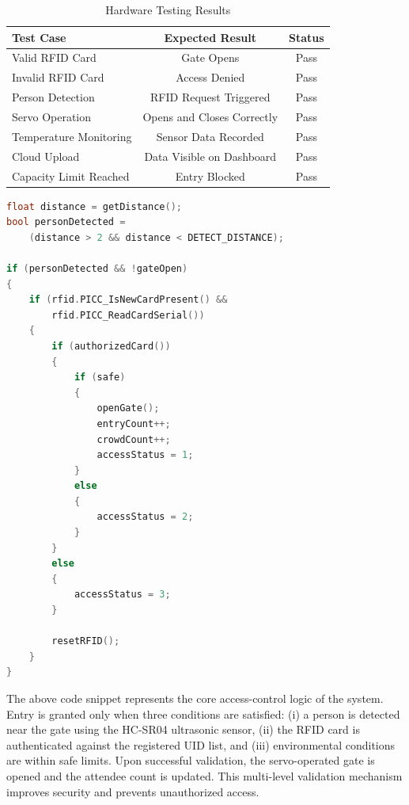 \documentclass[12pt,a4paper]{report}
\begin{document}
\vspace{0.5cm}
{\footnotesize

\begin{table}[H]
\centering
\caption{Hardware Testing Results}
\begin{tabular}{|l|c|c|}
\hline
Test Case & Expected Result & Status \\
\hline
Valid RFID Card & Gate Opens & Pass \\
Invalid RFID Card & Access Denied & Pass \\
Person Detection & RFID Request Triggered & Pass \\
Servo Operation & Opens and Closes Correctly & Pass \\
Temperature Monitoring & Sensor Data Recorded & Pass \\
Cloud Upload & Data Visible on Dashboard & Pass \\
Capacity Limit Reached & Entry Blocked & Pass \\
\hline
\end{tabular}
\end{table}

\begin{lstlisting}[language=C++, caption={Core Access Control Logic}]
float distance = getDistance();
bool personDetected =
    (distance > 2 && distance < DETECT_DISTANCE);

if (personDetected && !gateOpen)
{
    if (rfid.PICC_IsNewCardPresent() &&
        rfid.PICC_ReadCardSerial())
    {
        if (authorizedCard())
        {
            if (safe)
            {
                openGate();
                entryCount++;
                crowdCount++;
                accessStatus = 1;
            }
            else
            {
                accessStatus = 2;
            }
        }
        else
        {
            accessStatus = 3;
        }

        resetRFID();
    }
}
\end{lstlisting}

The above code snippet represents the core access-control logic of the system. Entry is granted only when three conditions are satisfied: (i) a person is detected near the gate using the HC-SR04 ultrasonic sensor, (ii) the RFID card is authenticated against the registered UID list, and (iii) environmental conditions are within safe limits. Upon successful validation, the servo-operated gate is opened and the attendee count is updated. This multi-level validation mechanism improves security and prevents unauthorized access.

}
\end{document}
